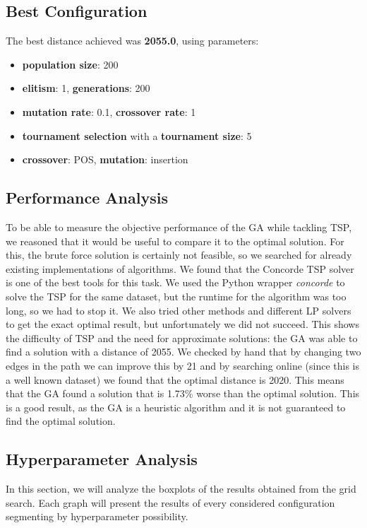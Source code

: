 \documentclass[11pt]{article}
\begin{document}
\subsection{Best Configuration}

The best distance achieved was \textbf{2055.0}, using parameters:
\begin{itemize}
    \item \textbf{population size}: 200
    \item \textbf{elitism}: 1,  \textbf{generations}: 200
    \item \textbf{mutation rate}: 0.1,  \textbf{crossover rate}: 1
    \item \textbf{tournament selection} with a \textbf{tournament size}: 5
    \item \textbf{crossover}: POS,   \textbf{mutation}: insertion
\end{itemize}

\subsection{Performance Analysis}
To be able to measure the objective performance of the GA while tackling TSP, we reasoned that it would be useful to compare it to the optimal solution. For this, the brute force solution is certainly not feasible, so we searched for already existing implementations of algorithms. We found that the Concorde TSP solver is one of the best tools for this task. We used the Python wrapper \textit{concorde} to solve the TSP for the same dataset, but the runtime for the algorithm was too long, so we had to stop it. We also tried other methods and different LP solvers to get the exact optimal result, but unfortunately we did not succeed. This shows the difficulty of TSP and the need for approximate solutions: the GA was able to find a solution with a distance of 2055. We checked by hand that by changing two edges in the path we can improve this by 21 and by searching online (since this is a well known dataset) we found that the optimal distance is 2020. This means that the GA found a solution that is 1.73\% worse than the optimal solution. This is a good result, as the GA is a heuristic algorithm and it is not guaranteed to find the optimal solution.

\subsection{Hyperparameter Analysis}
In this section, we will analyze the boxplots of the results obtained from the grid search. Each graph will present the results of every considered configuration segmenting by hyperparameter possibility.
\end{document}
